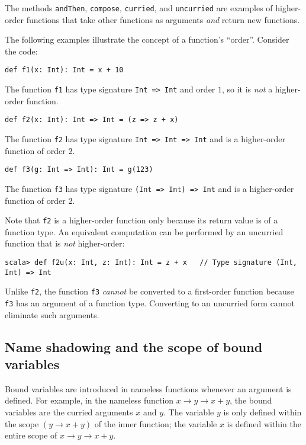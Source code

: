 The methods \lstinline!andThen!, \lstinline!compose!, \lstinline!curried!,
and \lstinline!uncurried! are examples of higher-order functions
that take other functions as arguments \emph{and} return new functions.

The following examples illustrate the concept of a function\textsf{'}s \textsf{``}order\textsf{''}.
Consider the code:
\begin{lstlisting}
def f1(x: Int): Int = x + 10
\end{lstlisting}
The function \texttt{}\lstinline!f1! has type signature \texttt{}\lstinline!Int => Int!
and order $1$, so it is \emph{not} a higher-order function.
\begin{lstlisting}
def f2(x: Int): Int => Int = (z => z + x)
\end{lstlisting}
The function \texttt{}\lstinline!f2! has type signature \texttt{}\lstinline!Int => Int => Int!
and is a higher-order function of order $2$. 
\begin{lstlisting}
def f3(g: Int => Int): Int = g(123)
\end{lstlisting}
The function \texttt{}\lstinline!f3! has type signature \texttt{}\lstinline!(Int => Int) => Int!
and is a higher-order function of order $2$.

Note that \texttt{}\lstinline!f2! is a higher-order function only
because its return value is of a function type. An equivalent computation
can be performed by an uncurried function that is \emph{not} higher-order:
\begin{lstlisting}
scala> def f2u(x: Int, z: Int): Int = z + x   // Type signature (Int, Int) => Int
\end{lstlisting}
Unlike \lstinline!f2!, the function \lstinline!f3! \emph{cannot}
be converted to a first-order function because \lstinline!f3! has
an argument of a function type. Converting to an uncurried form cannot
eliminate such arguments.

\subsection{Name shadowing and the scope of bound variables}

Bound variables are introduced in nameless functions whenever an argument
is defined. For example, in the nameless function $x\rightarrow y\rightarrow x+y$,
the bound variables are the curried arguments $x$ and $y$. The variable
$y$ is only defined within the scope $\left(y\rightarrow x+y\right)$
of the inner function; the variable $x$ is defined within the entire
scope of $x\rightarrow y\rightarrow x+y$.

